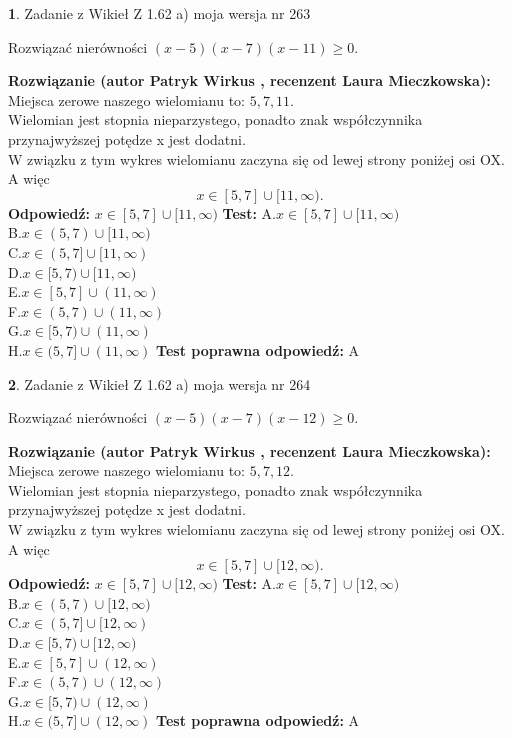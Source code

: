 \documentclass[12pt, a4paper]{article}
\theoremstyle{definition} %
\newtheorem{zad}{}
\newcommand{\zadStart}[1]{\begin{zad}#1\newline}
\newcommand{\zadStop}{\end{zad}}
\newcommand{\rozwStart}[2]{\noindent \textbf{Rozwiązanie (autor #1 , recenzent #2): }\newline}
\newcommand{\rozwStop}{\newline}
\newcommand{\odpStart}{\noindent \textbf{Odpowiedź:}\newline}
\newcommand{\odpStop}{\newline}
\newcommand{\testStart}{\noindent \textbf{Test:}\newline}
\newcommand{\testStop}{\newline}
\newcommand{\kluczStart}{\noindent \textbf{Test poprawna odpowiedź:}\newline}
\newcommand{\kluczStop}{\newline}
\begin{document}
\zadStart{Zadanie z Wikieł Z 1.62 a) moja wersja nr 263}

Rozwiązać nierówności $(x-5)(x-7)(x-11)\ge0$.
\zadStop
\rozwStart{Patryk Wirkus}{Laura Mieczkowska}
Miejsca zerowe naszego wielomianu to: $5, 7, 11$.\\
Wielomian jest stopnia nieparzystego, ponadto znak współczynnika przy\linebreak najwyższej potędze x jest dodatni.\\ W związku z tym wykres wielomianu zaczyna się od lewej strony poniżej osi OX. A więc $$x \in [5,7] \cup [11,\infty).$$
\rozwStop
\odpStart
$x \in [5,7] \cup [11,\infty)$
\odpStop
\testStart
A.$x \in [5,7] \cup [11,\infty)$\\
B.$x \in (5,7) \cup [11,\infty)$\\
C.$x \in (5,7] \cup [11,\infty)$\\
D.$x \in [5,7) \cup [11,\infty)$\\
E.$x \in [5,7] \cup (11,\infty)$\\
F.$x \in (5,7) \cup (11,\infty)$\\
G.$x \in [5,7) \cup (11,\infty)$\\
H.$x \in (5,7] \cup (11,\infty)$
\testStop
\kluczStart
A
\kluczStop



\zadStart{Zadanie z Wikieł Z 1.62 a) moja wersja nr 264}

Rozwiązać nierówności $(x-5)(x-7)(x-12)\ge0$.
\zadStop
\rozwStart{Patryk Wirkus}{Laura Mieczkowska}
Miejsca zerowe naszego wielomianu to: $5, 7, 12$.\\
Wielomian jest stopnia nieparzystego, ponadto znak współczynnika przy\linebreak najwyższej potędze x jest dodatni.\\ W związku z tym wykres wielomianu zaczyna się od lewej strony poniżej osi OX. A więc $$x \in [5,7] \cup [12,\infty).$$
\rozwStop
\odpStart
$x \in [5,7] \cup [12,\infty)$
\odpStop
\testStart
A.$x \in [5,7] \cup [12,\infty)$\\
B.$x \in (5,7) \cup [12,\infty)$\\
C.$x \in (5,7] \cup [12,\infty)$\\
D.$x \in [5,7) \cup [12,\infty)$\\
E.$x \in [5,7] \cup (12,\infty)$\\
F.$x \in (5,7) \cup (12,\infty)$\\
G.$x \in [5,7) \cup (12,\infty)$\\
H.$x \in (5,7] \cup (12,\infty)$
\testStop
\kluczStart
A
\kluczStop
\end{document}
